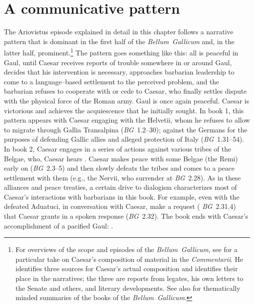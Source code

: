 \documentclass[12pt,letterpaper,oneside,final]{memoir}
\begin{document}
\section{A communicative pattern}
\label{comm-patt}
The Ariovistus episode explained in detail in this chapter follows a narrative pattern that is dominant in the first half of the \emph{Bellum~Gallicum} and, in the latter half, prominent.\footnote{For overviews of the scope and episodes of the \emph{Bellum~Gallicum}, see \textcite[49--56]{rambaud1966} for a particular take on Caesar's composition of material in the \emph{Commentarii}. He identifies three sources for Caesar's actual composition and identifies their place in the narratives; the three are reports from legates, his own letters to the Senate and others, and literary developments. See also \textcite[25--49]{adcock1956} for thematically minded summaries of the books of the \emph{Bellum~Gallicum}.} The pattern goes something like this: all is peaceful in Gaul, until Caesar receives reports of trouble somewhere in or around Gaul, decides that his intervention is necessary, approaches barbarian leadership to come to a language--based settlement to the perceived problem, and the barbarian refuses to cooperate with or cede to Caesar, who finally settles dispute with the physical force of the Roman army. Gaul is once again peaceful. Caesar is victorious and achieves the acquiescence that he initially sought. In book 1, this pattern appears with Caesar engaging with the Helvetii, whom he refuses to allow to migrate through Gallia Transalpina (\emph{BG}~1.2--30); against the Germans for the purposes of defending Gallic allies and alleged protection of Italy (\emph{BG}~1.31--54). In book 2, Caesar engages in a series of actions against various tribes of the Belgae, who, Caesar hears . Caesar makes peace with some Belgae (the Remi) early on (\emph{BG}~2.3--5) and then slowly defeats the tribes and comes to a peace settlement with them (e.g., the Nervii, who surrender at \emph{BG}~2.28). As in these alliances and peace treaties, a certain drive to dialogism characterizes most of Caesar's interactions with barbarians in this book. For example, even with the defeated Aduatuci, in conversation with Caesar, make a request ( \emph{BG}~2.31.4) that Caesar grants in a spoken response (\emph{BG}~2.32). The book ends with Caesar's accomplishment of a pacified Gaul: .
\end{document}
